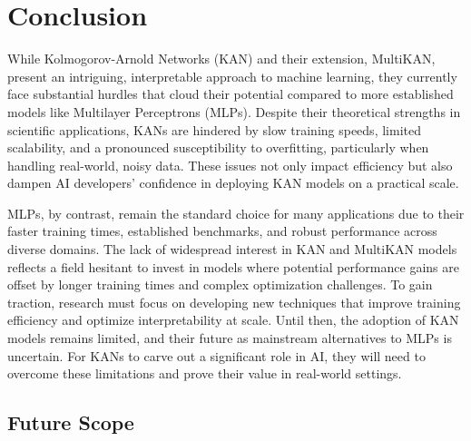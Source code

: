 \chapter{Conclusion}

While Kolmogorov-Arnold Networks (KAN) and their extension, MultiKAN, present an intriguing, interpretable approach to machine learning, they currently face substantial hurdles that cloud their potential compared to more established models like Multilayer Perceptrons (MLPs). Despite their theoretical strengths in scientific applications, KANs are hindered by slow training speeds, limited scalability, and a pronounced susceptibility to overfitting, particularly when handling real-world, noisy data. These issues not only impact efficiency but also dampen AI developers' confidence in deploying KAN models on a practical scale.

MLPs, by contrast, remain the standard choice for many applications due to their faster training times, established benchmarks, and robust performance across diverse domains. The lack of widespread interest in KAN and MultiKAN models reflects a field hesitant to invest in models where potential performance gains are offset by longer training times and complex optimization challenges. To gain traction, research must focus on developing new techniques that improve training efficiency and optimize interpretability at scale. Until then, the adoption of KAN models remains limited, and their future as mainstream alternatives to MLPs is uncertain. For KANs to carve out a significant role in AI, they will need to overcome these limitations and prove their value in real-world settings.

\clearpage

\section{Future Scope}

